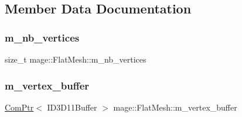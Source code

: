 \subsection{Member Data Documentation}
\hypertarget{classmage_1_1_flat_mesh_aabb71e0a08a465ca439e444c2325d29f}{}\label{classmage_1_1_flat_mesh_aabb71e0a08a465ca439e444c2325d29f} 
\subsubsection{\texorpdfstring{m\+\_\+nb\+\_\+vertices}{m\_nb\_vertices}}
{\footnotesize\ttfamily size\+\_\+t mage\+::\+Flat\+Mesh\+::m\+\_\+nb\+\_\+vertices\hspace{0.3cm}{\ttfamily [protected]}}

\hypertarget{classmage_1_1_flat_mesh_ab02d4e6870b91ddc4d5520cd723803c5}{}\label{classmage_1_1_flat_mesh_ab02d4e6870b91ddc4d5520cd723803c5} 
\subsubsection{\texorpdfstring{m\+\_\+vertex\+\_\+buffer}{m\_vertex\_buffer}}
{\footnotesize\ttfamily \hyperlink{namespacemage_ae74f374780900893caa5555d1031fd79}{Com\+Ptr}$<$ I\+D3\+D11\+Buffer $>$ mage\+::\+Flat\+Mesh\+::m\+\_\+vertex\+\_\+buffer\hspace{0.3cm}{\ttfamily [protected]}}

